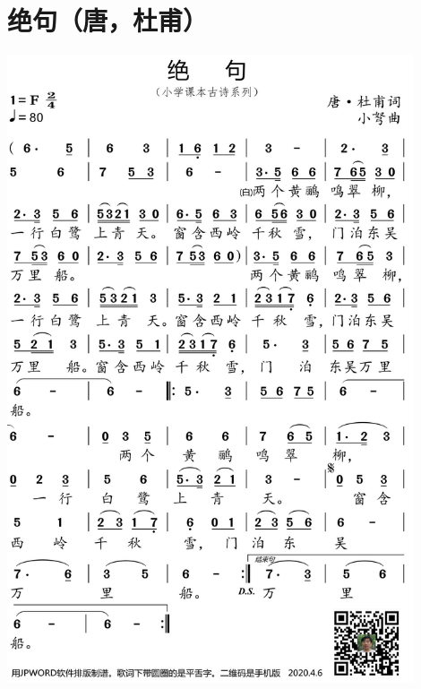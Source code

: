 \documentclass[cn,pad,chinesefont=nofont,twocol]{elegantbook}
\begin{document}
\section{绝句（唐，杜甫）}
    \includegraphics[width=0.9\textwidth]{dongxiao/20200627-古诗-杜甫-绝句.jpg}   
\end{document}
